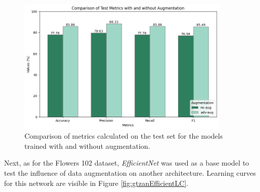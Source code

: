 \begin{figure}[!h]
    \centering
    \includegraphics[width=0.9\textwidth]{Images/gtzan_plots/test_metrics_gtzan.png}
    \caption{Comparison of metrics calculated on the test set for the models trained with and without augmentation.}
    \label{fig:gtzanTestBars}
\end{figure}


Next, as for the Flowers 102 dataset, \textit{EfficientNet} was used as a base model to test the influence of data augmentation on another architecture. Learning curves for this network are visible in Figure \ref{fig:gtzanEfficientLC}.


